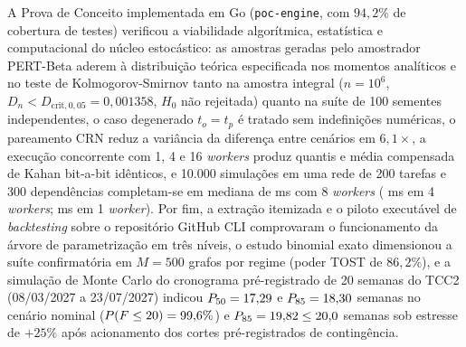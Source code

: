 \documentclass[12pt,openany,oneside,a4paper,english,brazilian,sumario=tradicional]{abntex2}
\begin{document}
A Prova de Conceito implementada em Go (\texttt{poc-engine}, com $94{,}2\%$ de cobertura de testes) verificou a viabilidade algorítmica, estatística e computacional do núcleo estocástico: as amostras geradas pelo amostrador PERT-Beta aderem à distribuição teórica especificada nos momentos analíticos e no teste de Kolmogorov-Smirnov tanto na amostra integral ($n=10^6$, $D_n < D_{\mathrm{crit},0{,}05} = 0{,}001358$, $H_0$ não rejeitada) quanto na suíte de 100 sementes independentes, o caso degenerado $t_o=t_p$ é tratado sem indefinições numéricas, o pareamento CRN reduz a variância da diferença entre cenários em $6{,}1\times$, a execução concorrente com 1, 4 e 16 \textit{workers} produz quantis e média compensada de Kahan bit-a-bit idênticos, e 10.000 simulações em uma rede de 200 tarefas e 300 dependências completam-se em mediana de \benchSynthWEightMedMs{} ms com 8 \textit{workers} (\benchSynthWFourMedMs{} ms em 4 \textit{workers}; \benchSynthWOneMedMs{} ms em 1 \textit{worker}). Por fim, a extração itemizada e o piloto executável de \textit{backtesting} sobre o repositório GitHub CLI comprovaram o funcionamento da árvore de parametrização em três níveis, o estudo binomial exato dimensionou a suíte confirmatória em $M=500$ grafos por regime (poder TOST de $86{,}2\%$), e a simulação de Monte Carlo do cronograma pré-registrado de 20 semanas do TCC2 (08/03/2027 a 23/07/2027) indicou $P_{50}=17{,}29{}$ e $P_{85}=18{,}30{}$ semanas no cenário nominal ($P(F \le 20) = 99{,}6{}\%$) e $P_{85}=19{,}82{} \le 20{,}0$ semanas sob estresse de $+25\%$ após acionamento dos cortes pré-registrados de contingência.

\postextual


\end{document}
